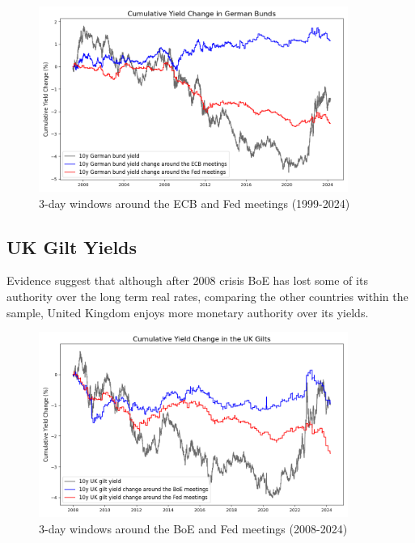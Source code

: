 \begin{figure}[!htbp]
    \centering
    \includegraphics[width=0.9\textwidth]{figures/1999_german_bunds_figure1a.png}
    \caption{3-day windows around the ECB and Fed meetings (1999-2024)}
    \label{fig:german1999}
\end{figure}


\subsection{UK Gilt Yields}

Evidence suggest that although after 2008 crisis BoE has lost some of its authority over the long term real rates, comparing the other countries within the sample, United Kingdom enjoys more monetary authority over its yields.

\begin{figure}[!htbp]
    \centering
    \includegraphics[width=0.9\textwidth]{figures/2008_uk_gilts_figure1a.png}
    \caption{3-day windows around the BoE and Fed meetings (2008-2024)}
    \label{fig:uk2008}
\end{figure}

